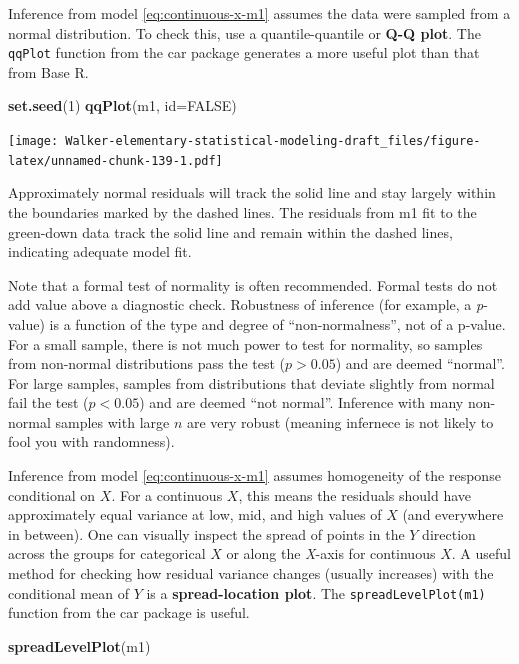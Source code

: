 \documentclass[]{book}
\newenvironment{Shaded}{\begin{snugshade}}{\end{snugshade}}
\newcommand{\DataTypeTok}[1]{\textcolor[rgb]{0.13,0.29,0.53}{#1}}
\newcommand{\DecValTok}[1]{\textcolor[rgb]{0.00,0.00,0.81}{#1}}
\newcommand{\KeywordTok}[1]{\textcolor[rgb]{0.13,0.29,0.53}{\textbf{#1}}}
\newcommand{\NormalTok}[1]{#1}
\newcommand{\OtherTok}[1]{\textcolor[rgb]{0.56,0.35,0.01}{#1}}
\begin{document}
Inference from model \eqref{eq:continuous-x-m1} assumes the data were sampled from a normal distribution. To check this, use a quantile-quantile or \textbf{Q-Q plot}. The \texttt{qqPlot} function from the car package generates a more useful plot than that from Base R.

\begin{Shaded}
\begin{Highlighting}[]
\KeywordTok{set.seed}\NormalTok{(}\DecValTok{1}\NormalTok{)}
\KeywordTok{qqPlot}\NormalTok{(m1, }\DataTypeTok{id=}\OtherTok{FALSE}\NormalTok{)}
\end{Highlighting}
\end{Shaded}

\texttt{[image: Walker-elementary-statistical-modeling-draft\_files/figure-latex/unnamed-chunk-139-1.pdf]}

Approximately normal residuals will track the solid line and stay largely within the boundaries marked by the dashed lines. The residuals from m1 fit to the green-down data track the solid line and remain within the dashed lines, indicating adequate model fit.

Note that a formal test of normality is often recommended. Formal tests do not add value above a diagnostic check. Robustness of inference (for example, a \emph{p}-value) is a function of the type and degree of ``non-normalness'', not of a p-value. For a small sample, there is not much power to test for normality, so samples from non-normal distributions pass the test (\(p > 0.05\)) and are deemed ``normal''. For large samples, samples from distributions that deviate slightly from normal fail the test (\(p < 0.05\)) and are deemed ``not normal''. Inference with many non-normal samples with large \(n\) are very robust (meaning infernece is not likely to fool you with randomness).

Inference from model \eqref{eq:continuous-x-m1} assumes homogeneity of the response conditional on \(X\). For a continuous \(X\), this means the residuals should have approximately equal variance at low, mid, and high values of \(X\) (and everywhere in between). One can visually inspect the spread of points in the \(Y\) direction across the groups for categorical \(X\) or along the \emph{X}-axis for continuous \(X\). A useful method for checking how residual variance changes (usually increases) with the conditional mean of \(Y\) is a \textbf{spread-location plot}. The \texttt{spreadLevelPlot(m1)} function from the car package is useful.

\begin{Shaded}
\begin{Highlighting}[]
\KeywordTok{spreadLevelPlot}\NormalTok{(m1)}
\end{Highlighting}
\end{Shaded}
\end{document}
